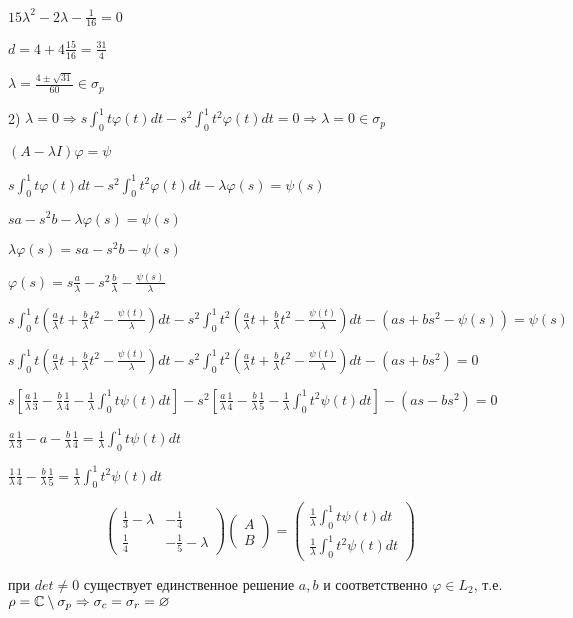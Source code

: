 \documentclass[russian]{article}
\begin{document}
$15 \lambda ^2 - 2 \lambda - \frac{1}{16} = 0$

$d = 4 + 4 \frac{15}{16} = \frac{31}{4}$

$\lambda = \frac{4 \pm \sqrt{31}}{60} \in \sigma_p$

2) $\lambda = 0 \Rightarrow s\int_0^1t\varphi(t)dt - s^2 \int _0 ^1 t^2 \varphi (t) dt = 0 \Rightarrow \lambda = 0 \in \sigma _p$

$(A-\lambda I)\varphi = \psi$

$s\int_0^1t\varphi(t)dt - s^2 \int_0^1t^2\varphi(t)dt - \lambda \varphi(s)= \psi(s)$

$s a - s^2 b - \lambda \varphi(s)= \psi(s)$

$\lambda \varphi(s) = s a - s^2 b - \psi(s)$

$\varphi(s) = s \frac{a}{\lambda} - s^2 \frac{b}{\lambda} - \frac{\psi(s)}{\lambda}$

$s\int_0^1t(\frac{a}{\lambda} t + \frac{b}{\lambda}t^2 - \frac{\psi(t)}{\lambda})dt - s^2 \int _0^1 t^2(\frac{a}{\lambda} t + \frac{b}{\lambda}t^2 - \frac{\psi(t)}{\lambda})dt - (a s + b s^2 - \psi(s)) = \psi(s)$

$s\int_0^1t(\frac{a}{\lambda} t + \frac{b}{\lambda}t^2 - \frac{\psi(t)}{\lambda})dt - s^2 \int _0^1 t^2(\frac{a}{\lambda} t + \frac{b}{\lambda}t^2 - \frac{\psi(t)}{\lambda})dt - (a s + b s^2) = 0$

$s[\frac{a}{\lambda}\frac{1}{3}-\frac{b}{\lambda}\frac{1}{4} - \frac{1}{\lambda}\int_0^1t\psi(t)dt] - s^2[\frac{a}{\lambda}\frac{1}{4}-\frac{b}{\lambda}\frac{1}{5} - \frac{1}{\lambda}\int_0^1 t^2\psi(t) dt] - (a s - b s ^ 2) = 0$

$\frac{a}{\lambda}\frac{1}{3} - a - \frac{b}{\lambda}\frac{1}{4} = \frac{1}{\lambda}\int_0^1 t \psi (t) dt$

$\frac{1}{\lambda}\frac{1}{4} - \frac{b}{\lambda}\frac{1}{5} = \frac{1}{\lambda}\int_0^1t^2 \psi(t) dt$

\begin{equation*}
\begin{pmatrix}
\frac{1}{3}-\lambda & -\frac{1}{4} \\
\frac{1}{4} & -\frac{1}{5}-\lambda
\end{pmatrix} 
\begin{pmatrix}
A \\
B
\end{pmatrix}
=
\begin{pmatrix}
\frac{1}{\lambda}\int_0^1 t \psi (t) dt \\
\frac{1}{\lambda}\int_0^1 t^2 \psi(t) dt
\end{pmatrix}
\end{equation*}

при $det \ne 0$ существует единственное решение $a,b$ и соответственно $\varphi \in L_2$, т.е. $\rho = \Bbb C \setminus \sigma_p \Rightarrow \sigma_c = \sigma_r = \varnothing$
\end{document}
